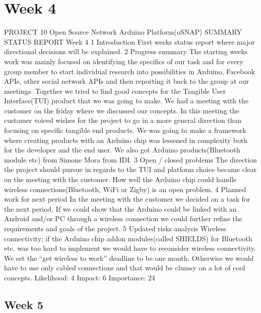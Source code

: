 \section{Week 4}

PROJECT 10 Open Source Network Arduino Platform(oSNAP)
SUMMARY STATUS REPORT
Week 4
1 Introduction
First weeks status report where major directional decisions will be explained.
2 Progress summary
The starting weeks work was mainly focused on identifying the specifics of our task and for
every group member to start individual research into possibilities in Arduino, Facebook APIs,
other social network APIs and then reporting it back to the group at our meetings. Together we
tried to find good concepts for the Tangible User Interface(TUI) product that we was going to
make. We had a meeting with the customer on the friday where we discussed our concepts. In
this meeting the customer voiced wishes for the project to go in a more general direction than
focusing on specific tangible end products. We was going to make a framework where creating
products with an Arduino chip was lessened in complexity both for the developer and the end
user.
We also got Arduino products(Bluetooth module etc) from Simone Mora from IDI.
3 Open / closed problems
The direction the project should pursue in regards to the TUI and platform choice became clear
on the meeting with the customer.
How well the Arduino chip could handle wireless connections(Bluetooth, WiFi or Zigby) is an
open problem.
4 Planned work for next period
In the meeting with the customer we decided on a task for the next period. If we could show that
the Arduino could be linked with an Android and/or PC through a wireless connection we could
further refine the requirements and goals of the project.
5 Updated risks analysis
Wireless connectivity; if the Arduino chip addon modules(called SHIELDS) for Bluetooth etc.
was too hard to implement we would have to reconsider wireless connectivity. We set the “get
wireless to work” deadline to be one month. Otherwise we would have to use only cabled
connections and that would be clumsy on a lot of cool concepts.
Likelihood: 4 Impact: 6 Importance: 24

\subsection{Week 5}

